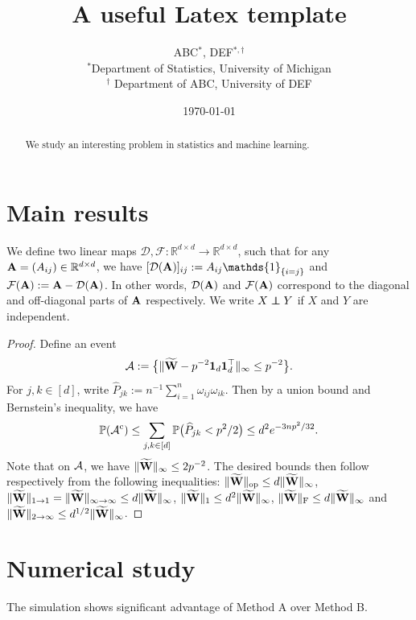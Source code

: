 \documentclass[11pt]{article}
\title{A useful Latex template}
\author{ABC$^\ast$, DEF$^{\ast,\dagger}$ \\
 \normalsize
 $^\ast$Department of Statistics, University of Michigan \\ \normalsize
 $^\dagger$ Department of ABC, University of DEF \\
\date{\today} }
\newcommand{\bfsym}[1]{\ensuremath{\boldsymbol{#1}}}
\newcommand{\indep}{\perp \hspace{-.25cm} \perp}
\def \bone   {\bfsym{1}}
\def \PP {\mathbb{P}}
\newcommand{\beq}  {\begin{equation}}
\newcommand{\eeq}  {\end{equation}}
\theoremstyle{definition}
\theoremstyle{plain}
\begin{document}
\maketitle

\begin{abstract}
  We study an interesting problem in statistics and machine learning. 
\end{abstract}

\section{Main results}

\label{Sec:Proofs}
We define two linear maps $\mathcal{D}, \mathcal{F}: \mathbb{R}^{d\times d}\to \mathbb{R}^{d\times d}$, such that for any $\mathbf{A} = (A_{ij}) \in\mathbb{R}^{d\times d}$, we have $[\mathcal{D}(\bA)]_{ij} := A_{ij}\mathds{1}_{\{i=j\}}$ and $\mathcal{F}(\mathbf{A}) := \mathbf{A} - \mathcal{D}(\mathbf{A})$. In other words, $\mathcal{D}(\mathbf{A})$ and $\mathcal{F}(\mathbf{A})$ correspond to the diagonal and off-diagonal parts of $\mathbf{A}$ respectively. We write $X \indep Y$ if $X$ and $Y$ are independent. 

\begin{proof}
Define an event
\beq
\cA := \bigl\{\|\widetilde \bW - p^{-2}\bone_d \bone_d^\top\|_\infty \leq p^{-2}\bigr\}.
\eeq
For $j,k\in[d]$, write $\widehat P_{jk} := n^{-1} \sum_{i = 1}^n \omega_{ij}\omega_{ik}$. Then by a union bound and Bernstein's inequality, we have
\[
\PP(\cA^{\mathrm{c}}) \leq \sum_{j,k\in [d]} \PP\bigl(\widehat P_{jk} < p^2/2\bigr) \leq d^2 e^{-3np^2/32}.
\]
Note that on ${\cal A}$, we have $\|\widetilde {\mathbf{W}}\|_\infty \leq 2p^{-2}$. The desired bounds then follow respectively from the following inequalities: $\|\widetilde {\mathbf{W}}\|_{\mathrm{op}} \leq d\|\widetilde {\mathbf{W}}\|_\infty$, $\|\widetilde {\mathbf{W}}\|_{1\to 1} = \|\widetilde {\mathbf{W}}\|_{\infty\to\infty} \leq d\|\widetilde {\mathbf{W}}\|_\infty$, $\|\widetilde {\mathbf{W}}\|_1 \leq d^2 \|\widetilde {\mathbf{W}}\|_\infty$, $\|\widetilde {\mathbf{W}}\|_{\mathrm{F}} \leq d\|\widetilde {\mathbf{W}}\|_\infty$ and $\|\widetilde {\mathbf{W}}\|_{2\to\infty} \leq d^{1/2}\|\widetilde {\mathbf{W}}\|_\infty$. 
\end{proof}

\section{Numerical study}

The simulation shows significant advantage of Method A over Method B. 

\newpage 
\end{document}
